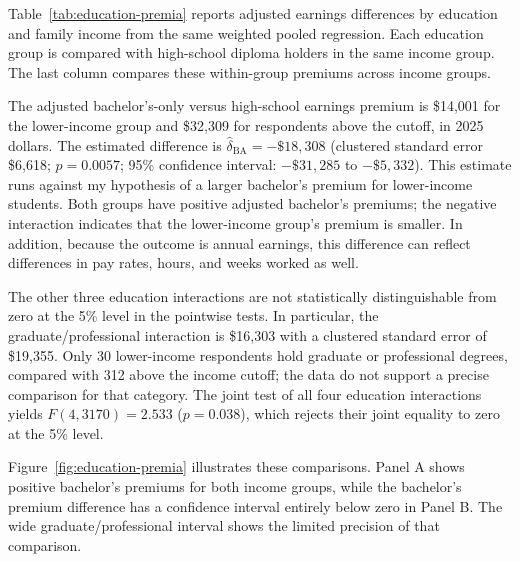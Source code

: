 \documentclass[12pt,letterpaper]{article}
\begin{document}
Table~\ref{tab:education-premia} reports adjusted earnings differences by education
and family income from the same weighted pooled regression. Each education group
is compared with high-school diploma holders in the same income group. The last
column compares these within-group premiums across income groups.\newline


The adjusted bachelor's-only versus high-school earnings premium is \$14,001 for
the lower-income group and \$32,309 for respondents above the cutoff, in 2025 dollars.
The estimated difference is $\hat\delta_{\mathrm{BA}}=-\$18,308$
(clustered standard error \$6,618; $p=0.0057$; 95\% confidence interval:
$-\$31,285$ to $-\$5,332$). This estimate runs against my hypothesis of a larger
bachelor's premium for lower-income students. Both groups have positive adjusted
bachelor's premiums; the negative interaction indicates that the lower-income
group's premium is smaller. In addition, because the outcome is annual earnings, 
this difference can reflect differences in pay rates, hours, and weeks worked as well.\newline

The other three education interactions are not statistically distinguishable from
zero at the 5\% level in the pointwise tests. In particular, the graduate/professional
interaction is \$16,303 with a clustered standard error of \$19,355. Only 30
lower-income respondents hold graduate or professional degrees, compared with
312 above the income cutoff; the data do not support a precise comparison for
that category. The joint test of all four education interactions yields
$F(4,3170)=2.533$ ($p=0.038$), which rejects their joint equality to zero
at the 5\% level.\newline

Figure~\ref{fig:education-premia} illustrates these comparisons. Panel A shows
positive bachelor's premiums for both income groups, while the bachelor's
premium difference has a confidence interval entirely below zero in Panel B.
The wide graduate/professional interval shows the limited precision of that
comparison.
\end{document}
